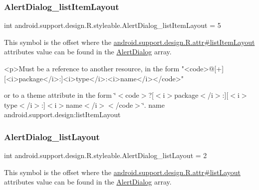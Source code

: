 \subsubsection{\texorpdfstring{Alert\+Dialog\+\_\+list\+Item\+Layout}{AlertDialog\_listItemLayout}}
{\footnotesize\ttfamily int android.\+support.\+design.\+R.\+styleable.\+Alert\+Dialog\+\_\+list\+Item\+Layout = 5\hspace{0.3cm}{\ttfamily [static]}}

This symbol is the offset where the \hyperlink{classandroid_1_1support_1_1design_1_1R_1_1attr_ad63c63d279d12a0e639383746d24e4fd}{android.\+support.\+design.\+R.\+attr\#list\+Item\+Layout} attribute\textquotesingle{}s value can be found in the \hyperlink{classandroid_1_1support_1_1design_1_1R_1_1styleable_aeccb758d25f6e242e6f3a23f3873ec21}{Alert\+Dialog} array.

\begin{DoxyVerb}      <p>Must be a reference to another resource, in the form "<code>@[+][<i>package</i>:]<i>type</i>:<i>name</i></code>"
\end{DoxyVerb}
 or to a theme attribute in the form \char`\"{}$<$code$>$?\mbox{[}$<$i$>$package$<$/i$>$\+:\mbox{]}\mbox{[}$<$i$>$type$<$/i$>$\+:\mbox{]}$<$i$>$name$<$/i$>$$<$/code$>$\char`\"{}.  name android.\+support.\+design\+:list\+Item\+Layout \mbox{\label{classandroid_1_1support_1_1design_1_1R_1_1styleable_a017ed84952eefc77dac2cae8ffba67c1}} 
\subsubsection{\texorpdfstring{Alert\+Dialog\+\_\+list\+Layout}{AlertDialog\_listLayout}}
{\footnotesize\ttfamily int android.\+support.\+design.\+R.\+styleable.\+Alert\+Dialog\+\_\+list\+Layout = 2\hspace{0.3cm}{\ttfamily [static]}}

This symbol is the offset where the \hyperlink{classandroid_1_1support_1_1design_1_1R_1_1attr_abdf7b3a668401dcc8dfa7dc72c880f11}{android.\+support.\+design.\+R.\+attr\#list\+Layout} attribute\textquotesingle{}s value can be found in the \hyperlink{classandroid_1_1support_1_1design_1_1R_1_1styleable_aeccb758d25f6e242e6f3a23f3873ec21}{Alert\+Dialog} array.

